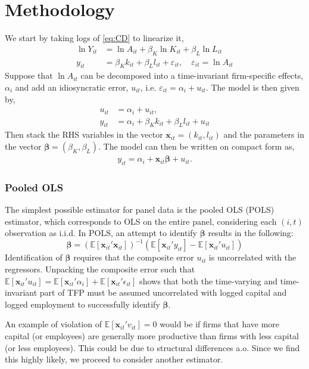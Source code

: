 \section{Methodology} \label{sec:methodology}

We start by taking logs of \eqref{eq:CD} to linearize it,
\begin{align*}
    \ln Y_{it} &= \ln A_{it} + \beta_K \ln K_{it} + \beta_L \ln L_{it} \\
    y_{it} &= \beta_K k_{it} + \beta_L l_{it} + \varepsilon_{it}, \quad \varepsilon_{it} = \ln A_{it}
\end{align*}
Suppose that $\ln A_{it}$ can be decomposed into a time-invariant firm-specific effects, $\alpha_i$ and add an idiosyncratic error, $u_{it}$, i.e. $\varepsilon_{it} = \alpha_i + u_{it}$. The model is then given by,
\begin{align*}
    u_{it} &= \alpha_i + u_{it}, \\
    y_{it} &= \alpha_i + \beta_K k_{it} + \beta_L l_{it} + u_{it}
\end{align*}
Then stack the RHS variables in the vector $\bm{x}_{it} = (k_{it}, l_{it})$ and the parameters in the vector $\bm{\beta} = (\beta_K, \beta_L)$. The model can then be written on compact form as,
\begin{align}
    y_{it} = \alpha_i + \bm{x}_{it} \bm{\beta} + u_{it}.
    \label{equationline}
\end{align}

\subsubsection*{Pooled OLS}
The simplest possible estimator for panel data is the pooled OLS (POLS) estimator, which corresponds to OLS on the entire panel, considering each $(i,t)$ observation as i.i.d. In POLS, an attempt to identify $\pmb{\beta}$ results in the following:
$$\pmb{\beta} = (\mathbb{E}[\pmb{x}_{it}'\pmb{x}_{it}])^{-1} \left(  \mathbb{E}[\pmb{x}_{it}'y_{it}]-\mathbb{E}[\pmb{x}_{it}' u_{it}]\right)$$
Identification of $\pmb{\beta}$ requires that the composite error $u_{it}$ is uncorrelated with the regressors. Unpacking the composite error  such that $\mathbb{E}[\pmb{x}_{it}'u_{it}]=\mathbb{E}[\pmb{x}_{it}'\alpha_{i}]+\mathbb{E}[\pmb{x}_{it}'\epsilon_{it}]$ shows that both the time-varying and time-invariant part of TFP must be assumed uncorrelated with logged capital and logged employment to successfully identify $\pmb{\beta}$.

An example of violation of $\mathbb{E}[\pmb{x}_{it}'v_{it}]=0$ would be if firms that have more capital (or employees) are generally more productive than firms with less capital (or less employees). This could be due to structural differences a.o. Since we find this highly likely, we proceed to consider another estimator.

